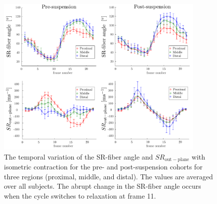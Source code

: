 \begin{figure}[!htb]
\vspace{+0.2cm}
\centering
\includegraphics[width=0.9\textwidth]{Figures/ULLS_fiberAngle.pdf}
\caption[The temporal variation of the SR-fiber angle and $SR_\mathrm{out-plane}$ with isometric contraction for the pre- and post-suspension cohort]{The temporal variation of the SR-fiber angle and $SR_\mathrm{out-plane}$ with isometric contraction for the pre- and post-suspension cohorts for three regions (proximal, middle, and distal). The values are averaged over all subjects. The abrupt change in the SR-fiber angle occurs when the cycle switches to relaxation at frame 11.}
\label{fig: SR1_3}
\end{figure}
